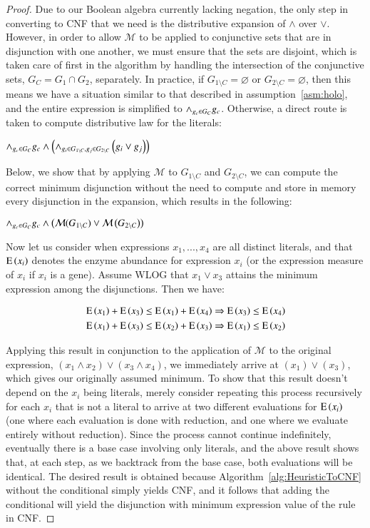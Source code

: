 \begin{proof}
Due to our Boolean algebra currently lacking negation, the only step
in converting to CNF that we need is the distributive expansion of 
$\land$ over $\lor$. However, in order to allow $\mathcal{M}$ to be
applied to conjunctive sets that are in disjunction with one another, 
we must ensure that the sets are disjoint, which is taken care of first
in the algorithm by handling the intersection of the conjunctive sets, 
$G_C = G_1 \cap G_2$, separately. In practice, if $G_{1\setminus C} = \varnothing$
or $G_{2\setminus C} = \varnothing$, then this means we have a situation similar
to that described in assumption~\ref{asm:holo}, and the entire expression
is simplified to $\land_{g_c \in G_C} g_c$. Otherwise, a direct route is 
taken to compute distributive law for the literals: 

$\land_{g_c \in G_C} g_c \land \left(\land_{g_i \in G_{1 \setminus C}, 
g_j \in G_{2\setminus C}} \left(g_i \lor g_j\right) \right)$

Below, we show that by applying $\mathcal{M}$ to $G_{1\setminus C}$
and $G_{2\setminus C}$, we can compute the correct minimum
disjunction without the need to compute and store in memory every 
disjunction in the expansion, which results in the following:

$\land_{g_c \in G_C} g_c \land \left(\mathcal{M}(G_{1 \setminus C}) 
\lor \mathcal{M}\left(G_{2\setminus C}\right)\right)$

Now let us consider when expressions $x_1, ..., x_4$
are all distinct literals, and that
$\operatorname{E}\left(x_i\right)$ denotes the enzyme abundance for expression $x_i$ (or the 
expression measure of $x_i$ if $x_i$ is a gene). Assume
WLOG that $x_1 \lor x_3$ attains the minimum expression among the
disjunctions. Then we have:

\begin{align*}
&\operatorname{E}\left(x_1\right) + \operatorname{E}\left(x_3\right) \leq \operatorname{E}\left(x_1\right) + \operatorname{E}\left(x_4\right) \Rightarrow \operatorname{E}\left(x_3\right) \leq \operatorname{E}\left(x_4\right) \\
&\operatorname{E}\left(x_1\right) + \operatorname{E}\left(x_3\right) \leq \operatorname{E}\left(x_2\right) + \operatorname{E}\left(x_3\right) \Rightarrow \operatorname{E}\left(x_1\right) \leq \operatorname{E}\left(x_2\right) 
\end{align*}

Applying this result in conjunction to the application of $\mathcal{M}$ to
the original expression, $(x_1 \land x_2) \lor (x_3 \land x_4)$, we
immediately arrive at $(x_1) \lor (x_3)$, which gives our originally
assumed minimum. To show that this result doesn't depend on the $x_i$
being literals, merely consider repeating this process recursively for
each $x_i$ that is not a literal to arrive at two different
evaluations for $\operatorname{E}\left(x_i\right)$ (one where each evaluation is done with
reduction, and one where we evaluate entirely without reduction).
Since the process cannot continue indefinitely, eventually there is a
base case involving only literals, and the above result shows that, at
each step, as we backtrack from the base case, both evaluations will
be identical. The desired result is obtained because
Algorithm~\ref{alg:HeuristicToCNF} without the conditional simply yields CNF,
and it follows that adding the conditional will yield the disjunction with
minimum expression value of the rule in CNF.
\end{proof}


